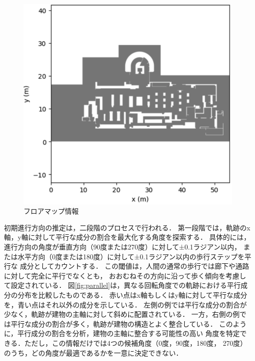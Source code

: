 \begin{figure}[H]
	\centering
	\includegraphics[width=\linewidth]{../image/floor-map.jpg}
  \caption{フロアマップ情報} \label{fig:floor-map}
\end{figure}

初期進行方向の推定は，二段階のプロセスで行われる．
第一段階では，軌跡のx軸，y軸に対して平行な成分の割合を最大化する角度を探索する．
具体的には，進行方向の角度が垂直方向（90度または270度）に対して±0.1ラジアン以内，
または水平方向（0度または180度）に対して±0.1ラジアン以内の歩行ステップを平行な
成分としてカウントする．
この閾値は，人間の通常の歩行では廊下や通路に対して完全に平行でなくとも，
おおむねその方向に沿って歩く傾向を考慮して設定されている．
図\ref{fig:parallel}は，異なる回転角度での軌跡における平行成分の分布を比較したものである．
赤い点はx軸もしくはy軸に対して平行な成分を，青い点はそれ以外の成分を示している．
左側の例では平行な成分の割合が少なく，軌跡が建物の主軸に対して斜めに配置されている．
一方，右側の例では平行な成分の割合が多く，軌跡が建物の構造とよく整合している．
このように，平行成分の割合を分析，建物の主軸に整合する可能性の高い
角度を特定できる．ただし，この情報だけでは4つの候補角度（0度，90度，180度，
270度）のうち，どの角度が最適であるかを一意に決定できない．

